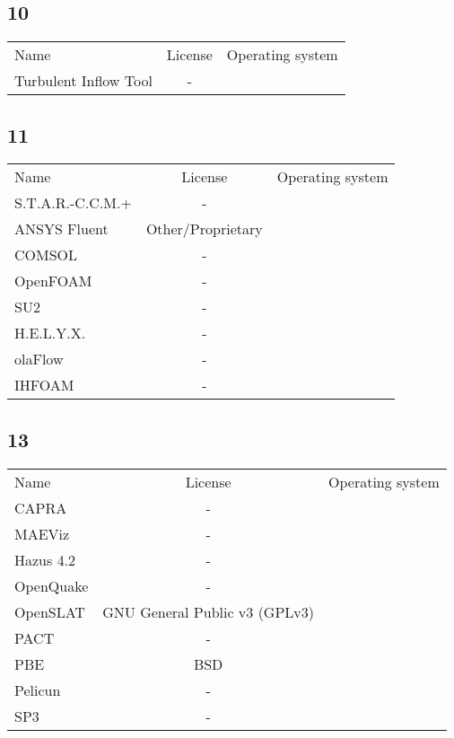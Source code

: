 \subsection{10}

\begin{table}[]
    \centering
    \begin{tabular}{l|cc}
    \toprule
    Name &  License & Operating system\\ 
        Turbulent Inflow Tool & - &\\ 
    \bottomrule
    \end{tabular}
\end{table}

\subsection{11}

\begin{table}[]
    \centering
    \begin{tabular}{l|cc}
    \toprule
    Name &  License & Operating system\\ 
        S.T.A.R.-C.C.M.+ & - &\\
        ANSYS Fluent &  Other/Proprietary  &\\
        COMSOL & - &\\
        OpenFOAM & - &\\
        SU2 & - &\\
        H.E.L.Y.X. & - &\\
        olaFlow & - &\\
        IHFOAM & - &\\ 
    \bottomrule
    \end{tabular}
\end{table}

\subsection{13}

\begin{table}[]
    \centering
    \begin{tabular}{l|cc}
    \toprule
    Name &  License & Operating system\\ 
        CAPRA & - &\\
        MAEViz & - &\\
        Hazus 4.2 & - &\\
        OpenQuake & - &\\
        OpenSLAT &  GNU General Public  v3 (GPLv3) &\\
        PACT & - &\\
        PBE &  BSD  &\\
        Pelicun & - &\\
        SP3 & - &\\ 
    \bottomrule
    \end{tabular}
\end{table}

